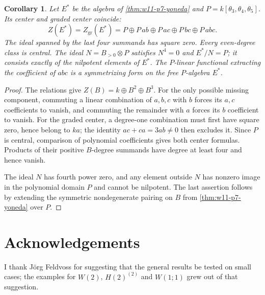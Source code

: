 \documentclass[11pt,reqno]{amsart}
\newtheorem{corollary}[corollary]{Corollary}
\theoremstyle{definition}
\theoremstyle{remark}
\theoremstyle{definition}
\begin{document}
\begin{corollary}\label{cor:w11-p7-yoneda-center}
Let $E^*$ be the algebra of \cref{thm:w11-p7-yoneda} and
$P=k[\theta_3,\theta_4,\theta_5]$. Its center and graded center coincide:
\[
 Z(E^*)=Z_{\mathrm{gr}}(E^*)
 =P\oplus P\,ab\oplus P\,ac\oplus P\,bc\oplus P\,abc.
\]
The ideal spanned by the last four summands has square zero.
Every even-degree class is central. The ideal
$N=B_{>0}\otimes P$ satisfies $N^4=0$ and $E^*/N=P$;
it consists exactly of the nilpotent elements of $E^*$.
The $P$-linear functional extracting the coefficient of $abc$ is
a symmetrizing form on the free $P$-algebra $E^*$.
\end{corollary}

\begin{proof}
The relations give $Z(B)=k\oplus B^2\oplus B^3$.
For the only possible missing component, commuting a linear
combination of $a,b,c$ with $b$ forces its $a,c$ coefficients to
vanish, and commuting the remainder with $a$ forces its $b$
coefficient to vanish. For the graded center, a degree-one
combination must first have square zero, hence belong to $ka$;
the identity $ac+ca=3ab\ne0$ then excludes it.
Since $P$ is central, comparison of polynomial coefficients
gives both center formulas. Products of their positive $B$-degree
summands have degree at least four and hence vanish.

The ideal $N$ has fourth power zero, and any element outside $N$
has nonzero image in the polynomial domain $P$ and cannot be
nilpotent. The last assertion follows by extending the symmetric
nondegenerate pairing on $B$ from \cref{thm:w11-p7-yoneda}
over $P$.
\end{proof}


\section*{Acknowledgements}

I thank J\"org Feldvoss for suggesting that the general results be tested
on small cases; the examples for $W(2)$, $H(2)^{(2)}$ and
$W(1;1)$ grew out of that suggestion.
\end{document}
